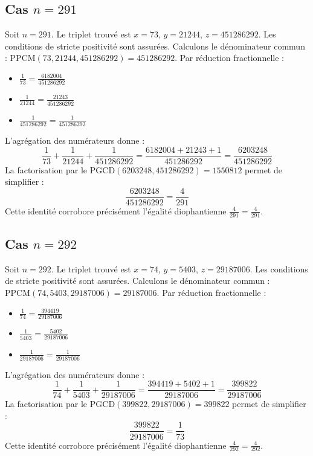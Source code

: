 \documentclass[11pt,a4paper]{article}
\begin{document}
\subsection{Cas $n = 291$}
Soit $n = 291$. Le triplet trouvé est $x = 73$, $y = 21244$, $z = 451286292$.
Les conditions de stricte positivité sont assurées.
Calculons le dénominateur commun : $\text{PPCM}(73, 21244, 451286292) = 451286292$.
Par réduction fractionnelle :
\begin{itemize}
    \item $\frac{1}{73} = \frac{6182004}{451286292}$
    \item $\frac{1}{21244} = \frac{21243}{451286292}$
    \item $\frac{1}{451286292} = \frac{1}{451286292}$
\end{itemize}
L'agrégation des numérateurs donne :
$$ \frac{1}{73} + \frac{1}{21244} + \frac{1}{451286292} = \frac{6182004 + 21243 + 1}{451286292} = \frac{6203248}{451286292} $$
La factorisation par le $\text{PGCD}(6203248, 451286292) = 1550812$ permet de simplifier :
$$ \frac{6203248}{451286292} = \frac{4}{291} $$
Cette identité corrobore précisément l'égalité diophantienne $\frac{4}{291} = \frac{4}{291}$.

\subsection{Cas $n = 292$}
Soit $n = 292$. Le triplet trouvé est $x = 74$, $y = 5403$, $z = 29187006$.
Les conditions de stricte positivité sont assurées.
Calculons le dénominateur commun : $\text{PPCM}(74, 5403, 29187006) = 29187006$.
Par réduction fractionnelle :
\begin{itemize}
    \item $\frac{1}{74} = \frac{394419}{29187006}$
    \item $\frac{1}{5403} = \frac{5402}{29187006}$
    \item $\frac{1}{29187006} = \frac{1}{29187006}$
\end{itemize}
L'agrégation des numérateurs donne :
$$ \frac{1}{74} + \frac{1}{5403} + \frac{1}{29187006} = \frac{394419 + 5402 + 1}{29187006} = \frac{399822}{29187006} $$
La factorisation par le $\text{PGCD}(399822, 29187006) = 399822$ permet de simplifier :
$$ \frac{399822}{29187006} = \frac{1}{73} $$
Cette identité corrobore précisément l'égalité diophantienne $\frac{4}{292} = \frac{4}{292}$.
\end{document}
